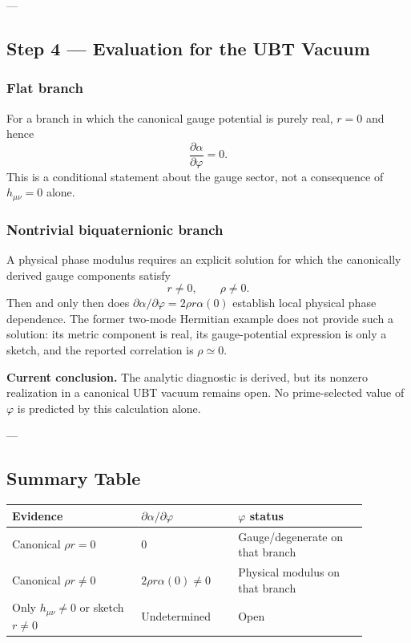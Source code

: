 ---

\subsection{Step 4 --- Evaluation for the UBT Vacuum}
\label{sec:phi_step4}

\subsubsection{Flat branch}

For a branch in which the canonical gauge potential is purely real,
$r=0$ and hence
\begin{equation}
 \frac{\partial\alpha}{\partial\varphi}=0.
\end{equation}
This is a conditional statement about the gauge sector, not a consequence of
$h_{\mu\nu}=0$ alone.

\subsubsection{Nontrivial biquaternionic branch}

A physical phase modulus requires an explicit solution for which the
canonically derived gauge components satisfy
\begin{equation}
 r\neq0,\qquad \rho\neq0.
\end{equation}
Then and only then does
$\partial\alpha/\partial\varphi=2\rho r\alpha(0)$ establish local physical
phase dependence.  The former two-mode Hermitian example does not provide
such a solution: its metric component is real, its gauge-potential expression
is only a sketch, and the reported correlation is $\rho\simeq0$.

\noindent\textbf{Current conclusion.}
The analytic diagnostic is derived, but its nonzero realization in a
canonical UBT vacuum remains open.  No prime-selected value of $\varphi$ is
predicted by this calculation alone.

---

\subsection{Summary Table}
\label{sec:phi_summary}

\begin{center}
\begin{tabular}{p{0.32\linewidth}p{0.24\linewidth}p{0.32\linewidth}}
\hline
\textbf{Evidence} & $\partial\alpha/\partial\varphi$ & \textbf{$\varphi$ status} \\
\hline
Canonical $\rho r=0$ & $0$ & Gauge/degenerate on that branch \\
Canonical $\rho r\neq0$ & $2\rho r\alpha(0)\neq0$ & Physical modulus on that branch \\
Only $h_{\mu\nu}\neq0$ or sketch $r\neq0$ & Undetermined & Open \\
\hline
\end{tabular}
\end{center}


